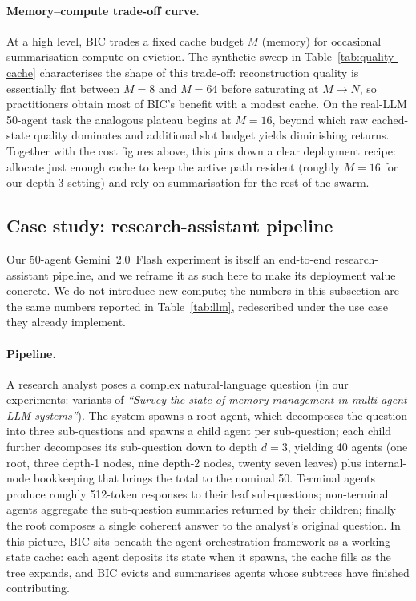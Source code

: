 \documentclass[fleqn,10pt]{article}
\theoremstyle{definition}
\newcommand{\slots}{M}
\begin{document}
\paragraph{Memory--compute trade-off curve.}
At a high level, BIC trades a fixed cache budget $\slots$ (memory)
for occasional summarisation compute on eviction. The synthetic
sweep in Table~\ref{tab:quality-cache} characterises the shape of
this trade-off: reconstruction quality is essentially flat between
$\slots{=}8$ and $\slots{=}64$ before saturating at $\slots \to N$,
so practitioners obtain most of BIC's benefit with a modest cache.
On the real-LLM 50-agent task the analogous plateau begins at
$\slots{=}16$, beyond which raw cached-state quality dominates and
additional slot budget yields diminishing returns. Together with
the cost figures above, this pins down a clear deployment recipe:
allocate just enough cache to keep the active path resident
(roughly $M{=}16$ for our depth-3 setting) and rely on summarisation
for the rest of the swarm.

\subsection*{Case study: research-assistant pipeline}

Our 50-agent Gemini~2.0~Flash experiment is itself an
end-to-end research-assistant pipeline, and we reframe it as such
here to make its deployment value concrete. We do not introduce new
compute; the numbers in this subsection are the same numbers
reported in Table~\ref{tab:llm}, redescribed under the use case they
already implement.

\paragraph{Pipeline.}
A research analyst poses a complex natural-language question (in
our experiments: variants of \emph{``Survey the state of memory
management in multi-agent LLM systems''}). The system spawns a
root agent, which decomposes the question into three sub-questions
and spawns a child agent per sub-question; each child further
decomposes its sub-question down to depth $d{=}3$, yielding 40
agents (one root, three depth-1 nodes, nine depth-2 nodes, twenty
seven leaves) plus internal-node bookkeeping that brings the
total to the nominal 50. Terminal agents produce roughly 512-token
responses to their leaf sub-questions; non-terminal agents
aggregate the sub-question summaries returned by their children;
finally the root composes a single coherent answer to the analyst's
original question. In this picture, BIC sits beneath the
agent-orchestration framework as a working-state cache: each agent
deposits its state when it spawns, the cache fills as the tree
expands, and BIC evicts and summarises agents whose subtrees have
finished contributing.
\end{document}
